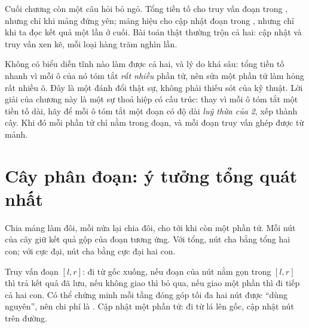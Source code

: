 \documentclass[../../algorithm.tex]{subfiles}
\begin{document}
Cuối chương  còn một câu hỏi bỏ ngỏ. Tổng tiền tố cho truy vấn đoạn trong , nhưng chỉ khi mảng đứng yên; mảng hiệu cho cập nhật đoạn trong , nhưng chỉ khi ta đọc kết quả một lần ở cuối. Bài toán thật thường trộn cả hai: cập nhật và truy vấn xen kẽ, mỗi loại hàng trăm nghìn lần.

Không có biểu diễn tĩnh nào làm được cả hai, và lý do khá sâu: tổng tiền tố nhanh vì mỗi ô của nó tóm tắt \emph{rất nhiều} phần tử, nên sửa một phần tử làm hỏng rất nhiều ô. Đây là một đánh đổi thật sự, không phải thiếu sót của kỹ thuật. Lời giải của chương này là một sự thoả hiệp có cấu trúc: thay vì mỗi ô tóm tắt một tiền tố dài, hãy để mỗi ô tóm tắt một đoạn có độ dài \emph{luỹ thừa của 2}, xếp thành cây. Khi đó mỗi phần tử chỉ nằm trong  đoạn, và mỗi đoạn truy vấn ghép được từ  mảnh.

\section{Cây phân đoạn: ý tưởng tổng quát nhất}

Chia mảng làm đôi, mỗi nửa lại chia đôi, cho tới khi còn một phần tử. Mỗi nút của cây giữ kết quả gộp của đoạn tương ứng. Với tổng, nút cha bằng tổng hai con; với cực đại, nút cha bằng cực đại hai con.

Truy vấn đoạn \([l,r]\): đi từ gốc xuống, nếu đoạn của nút nằm gọn trong \([l,r]\) thì trả kết quả đã lưu, nếu không giao thì bỏ qua, nếu giao một phần thì đi tiếp cả hai con. Có thể chứng minh mỗi tầng đóng góp tối đa hai nút được ``dùng nguyên'', nên chi phí là . Cập nhật một phần tử: đi từ lá lên gốc, cập nhật  nút trên đường.
\end{document}
